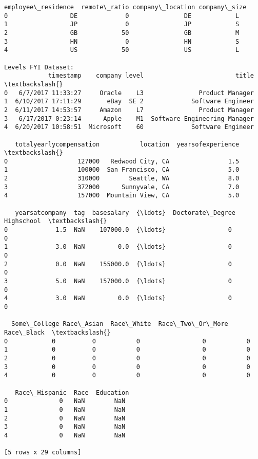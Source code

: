 \documentclass[11pt]{article}
\begin{document}
\begin{Verbatim}[commandchars=\\\{\}]
  employee\_residence  remote\_ratio company\_location company\_size
0                 DE             0               DE            L
1                 JP             0               JP            S
2                 GB            50               GB            M
3                 HN             0               HN            S
4                 US            50               US            L

Levels FYI Dataset:
            timestamp    company level                         title  \textbackslash{}
0   6/7/2017 11:33:27     Oracle    L3               Product Manager
1  6/10/2017 17:11:29       eBay  SE 2             Software Engineer
2  6/11/2017 14:53:57     Amazon    L7               Product Manager
3   6/17/2017 0:23:14      Apple    M1  Software Engineering Manager
4  6/20/2017 10:58:51  Microsoft    60             Software Engineer

   totalyearlycompensation           location  yearsofexperience  \textbackslash{}
0                   127000   Redwood City, CA                1.5
1                   100000  San Francisco, CA                5.0
2                   310000        Seattle, WA                8.0
3                   372000      Sunnyvale, CA                7.0
4                   157000  Mountain View, CA                5.0

   yearsatcompany  tag  basesalary  {\ldots}  Doctorate\_Degree  Highschool  \textbackslash{}
0             1.5  NaN    107000.0  {\ldots}                 0           0
1             3.0  NaN         0.0  {\ldots}                 0           0
2             0.0  NaN    155000.0  {\ldots}                 0           0
3             5.0  NaN    157000.0  {\ldots}                 0           0
4             3.0  NaN         0.0  {\ldots}                 0           0

  Some\_College Race\_Asian  Race\_White  Race\_Two\_Or\_More  Race\_Black  \textbackslash{}
0            0          0           0                 0           0
1            0          0           0                 0           0
2            0          0           0                 0           0
3            0          0           0                 0           0
4            0          0           0                 0           0

   Race\_Hispanic  Race  Education
0              0   NaN        NaN
1              0   NaN        NaN
2              0   NaN        NaN
3              0   NaN        NaN
4              0   NaN        NaN

[5 rows x 29 columns]
    \end{Verbatim}
\end{document}
